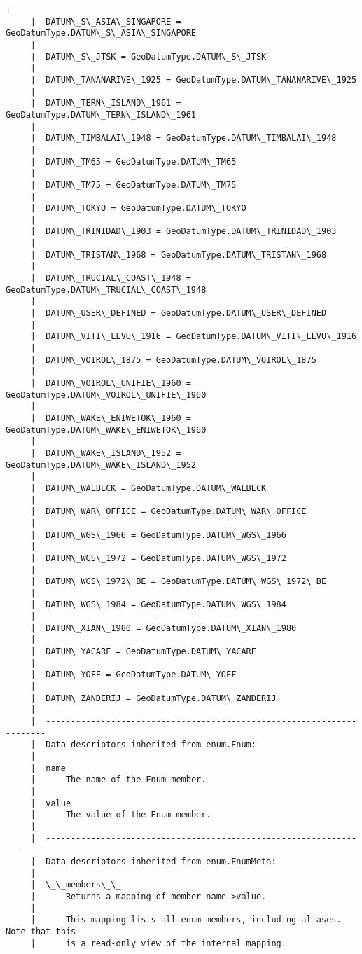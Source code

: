 \documentclass[11pt]{article}
\begin{document}
\begin{Verbatim}[commandchars=\\\{\}]
     |  
     |  DATUM\_S\_ASIA\_SINGAPORE = GeoDatumType.DATUM\_S\_ASIA\_SINGAPORE
     |  
     |  DATUM\_S\_JTSK = GeoDatumType.DATUM\_S\_JTSK
     |  
     |  DATUM\_TANANARIVE\_1925 = GeoDatumType.DATUM\_TANANARIVE\_1925
     |  
     |  DATUM\_TERN\_ISLAND\_1961 = GeoDatumType.DATUM\_TERN\_ISLAND\_1961
     |  
     |  DATUM\_TIMBALAI\_1948 = GeoDatumType.DATUM\_TIMBALAI\_1948
     |  
     |  DATUM\_TM65 = GeoDatumType.DATUM\_TM65
     |  
     |  DATUM\_TM75 = GeoDatumType.DATUM\_TM75
     |  
     |  DATUM\_TOKYO = GeoDatumType.DATUM\_TOKYO
     |  
     |  DATUM\_TRINIDAD\_1903 = GeoDatumType.DATUM\_TRINIDAD\_1903
     |  
     |  DATUM\_TRISTAN\_1968 = GeoDatumType.DATUM\_TRISTAN\_1968
     |  
     |  DATUM\_TRUCIAL\_COAST\_1948 = GeoDatumType.DATUM\_TRUCIAL\_COAST\_1948
     |  
     |  DATUM\_USER\_DEFINED = GeoDatumType.DATUM\_USER\_DEFINED
     |  
     |  DATUM\_VITI\_LEVU\_1916 = GeoDatumType.DATUM\_VITI\_LEVU\_1916
     |  
     |  DATUM\_VOIROL\_1875 = GeoDatumType.DATUM\_VOIROL\_1875
     |  
     |  DATUM\_VOIROL\_UNIFIE\_1960 = GeoDatumType.DATUM\_VOIROL\_UNIFIE\_1960
     |  
     |  DATUM\_WAKE\_ENIWETOK\_1960 = GeoDatumType.DATUM\_WAKE\_ENIWETOK\_1960
     |  
     |  DATUM\_WAKE\_ISLAND\_1952 = GeoDatumType.DATUM\_WAKE\_ISLAND\_1952
     |  
     |  DATUM\_WALBECK = GeoDatumType.DATUM\_WALBECK
     |  
     |  DATUM\_WAR\_OFFICE = GeoDatumType.DATUM\_WAR\_OFFICE
     |  
     |  DATUM\_WGS\_1966 = GeoDatumType.DATUM\_WGS\_1966
     |  
     |  DATUM\_WGS\_1972 = GeoDatumType.DATUM\_WGS\_1972
     |  
     |  DATUM\_WGS\_1972\_BE = GeoDatumType.DATUM\_WGS\_1972\_BE
     |  
     |  DATUM\_WGS\_1984 = GeoDatumType.DATUM\_WGS\_1984
     |  
     |  DATUM\_XIAN\_1980 = GeoDatumType.DATUM\_XIAN\_1980
     |  
     |  DATUM\_YACARE = GeoDatumType.DATUM\_YACARE
     |  
     |  DATUM\_YOFF = GeoDatumType.DATUM\_YOFF
     |  
     |  DATUM\_ZANDERIJ = GeoDatumType.DATUM\_ZANDERIJ
     |  
     |  ----------------------------------------------------------------------
     |  Data descriptors inherited from enum.Enum:
     |  
     |  name
     |      The name of the Enum member.
     |  
     |  value
     |      The value of the Enum member.
     |  
     |  ----------------------------------------------------------------------
     |  Data descriptors inherited from enum.EnumMeta:
     |  
     |  \_\_members\_\_
     |      Returns a mapping of member name->value.
     |      
     |      This mapping lists all enum members, including aliases. Note that this
     |      is a read-only view of the internal mapping.
    

\end{Verbatim}
\end{document}
